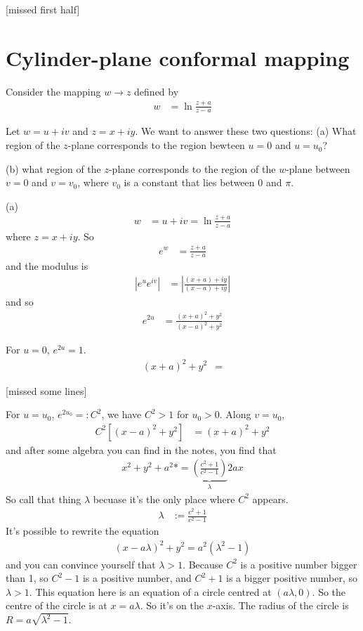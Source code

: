 [missed first half]
\section{Cylinder-plane conformal mapping}
Consider the mapping $w\to z$ defined by
\begin{align}
    w &= \ln\frac{z + a}{z - a}
\end{align}

Let $w=u + iv$ and $z = x + iy$.
We want to answer these two questions:
(a) What region of the $z$-plane corresponds to the region bewteen
$u=0$ and $u=u_0$?

(b) what region of the $z$-plane corresponds to the region of the $w$-plane
between $v=0$ and $v=v_0$,
where $v_0$ is a constant that lies between $0$ and $\pi$.

(a)
\begin{align}
    w &= u + iv = \ln \frac{z + a}{z - a}
\end{align}
where $z = x + iy$.
So
\begin{align}
    e^{w} &= \frac{z + a}{z - a}
\end{align}
and the modulus is
\begin{align}
    \left| e^{u} e^{iv} \right|
    &=
    \left|
        \frac{(x + a) + iy}{(x - a) + iy}
    \right|
\end{align}
and so
\begin{align}
    e^{2 u} &=
    \frac{(x + a)^2 + y^2}{(x - a)^2 + y^2}
\end{align}

For $u=0$, $e^{2 u} = 1$.
\begin{align}
    (x + a)^2 + y^2 &=
\end{align}


[missed some lines]

For $u=u_0$,
$e^{2 u_0} =: C^2$,
we have
$C^2 > 1$ for $u_0 > 0$.
Along $v=u_0$,
\begin{align}
    C^2\left[
        (x - a)^2 + y^2
    \right] &=
    (x + a)^2 + y^2
\end{align}
and after some algebra you can find in the notes,
you find that
\begin{align}
    x^2 + y^2 + a^2 *=
    \underbrace{\left(\frac{c^2 + 1}{c^2 - 1}\right)}_{\lambda} 2ax
\end{align}
So call that thing $\lambda$ becuase it's the only place where $C^2$ appears.
\begin{align}
    \lambda &:= \frac{c^2 + 1}{c^2 - 1}
\end{align}
It's possible to rewrite the equation
\begin{align}
    (x - a\lambda)^2 + y^2 = a^2 (\lambda^2 - 1)
\end{align}
and you can convince yourself that $\lambda > 1$.
Because $C^2$ is a positive number bigger than 1,
so $C^2 - 1$ is a positive number,
and $C^2 + 1$ is a bigger positive number,
so $\lambda > 1$.
This equation here is an equation of a circle
centred at $(a\lambda, 0)$.
So the centre of the circle is at $x=a\lambda$.
So it's on the $x$-axis.
The radius of the circle is
$R= a\sqrt{\lambda^2 - 1}$.


